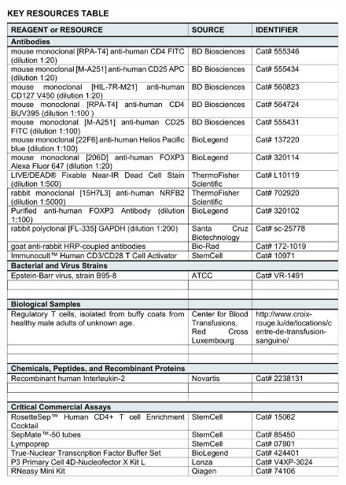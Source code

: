 \documentclass[oneside, 10pt, a4paper, twocolumn]{article}
\begin{document}
{\begin{figure}[ht!]
\centering
  \includegraphics[scale=0.63]{Fig4aSM.pdf} %
\end{figure}


}
\end{document}
